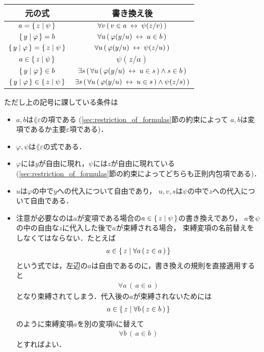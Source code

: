 	\begin{table}[H]
		\begin{center}
		\begin{tabular}{c|c}
			元の式 & 書き換え後 \\ \hline \hline
			$a = \{\, z \mid \psi\, \}$ & $\forall v\, (\, v \in a \hspace{0.25em}\leftrightarrow\hspace{0.25em} \psi(z/v)\, )$ \\ \hline
			$\{\, y \mid \varphi\, \} = b$ & $\forall u\, (\, \varphi(y/u) \hspace{0.25em}\leftrightarrow\hspace{0.25em} u \in b\, )$ \\ \hline
			$\{\, y \mid \varphi\, \} = \{\, z \mid \psi\, \}$ & $\forall u\, (\, \varphi(y/u) \hspace{0.25em}\leftrightarrow\hspace{0.25em} \psi(z/u)\, )$ \\ \hline
			$a \in \{\, z \mid \psi\, \}$ & $\psi(z/a)$ \\ \hline
			$\{\, y \mid \varphi\, \} \in b$ & $\exists s\, (\, \forall u\, (\, \varphi(y/u) \hspace{0.25em}\leftrightarrow\hspace{0.25em} u \in s\, ) \wedge s \in b\, )$ \\ \hline
			$\{\, y \mid \varphi\, \} \in \{\, z \mid \psi\, \}$ & $\exists s\, (\, \forall u\, (\, \varphi(y/u) \hspace{0.25em}\leftrightarrow\hspace{0.25em} u \in s\, ) \wedge \psi(z/s)\, )$ \\ \hline
		\end{tabular}
		\end{center}
	\end{table}
	
	ただし上の記号に課している条件は
	\begin{itemize}
		\item $a,b$は$\lang{\varepsilon}$の項である
			(\ref{sec:restriction_of_formulas}節の約束によって
			$a,b$は変項であるか主要$\varepsilon$項である)．
		\item $\varphi,\psi$は$\lang{\varepsilon}$の式である．
		\item $\varphi$には$y$が自由に現れ，$\psi$には$z$が自由に現れている
			(\ref{sec:restriction_of_formulas}節の約束によってどちらも正則内包項である)．
		\item $u$は$\varphi$の中で$y$への代入について自由であり，
			$u,v,s$は$\psi$の中で$z$への代入について自由である．
		\item 注意が必要なのは$a$が変項である場合の$a \in \{\, z \mid \psi\, \}$の書き換えであり，
			$a$を$\psi$の中の自由な$z$に代入した後で$a$が束縛される場合，
			束縛変項の名前替えをしなくてはならない．たとえば
			\begin{align}
				a \in \{\, z \mid \forall a\, (\, z \in a\, )\, \}
			\end{align}
			という式では，左辺の$a$は自由であるのに，書き換えの規則を直接適用すると
			\begin{align}
				\forall a\, (\, a \in a\, )
			\end{align}
			となり束縛されてしまう．代入後の$a$が束縛されないためには
			\begin{align}
				a \in \{\, z \mid \forall b\, (\, z \in b\, )\, \}
			\end{align}
			のように束縛変項$a$を別の変項$b$に替えて
			\begin{align}
				\forall b\, (\, a \in b\, )
			\end{align}
			とすればよい．
	\end{itemize}
	
